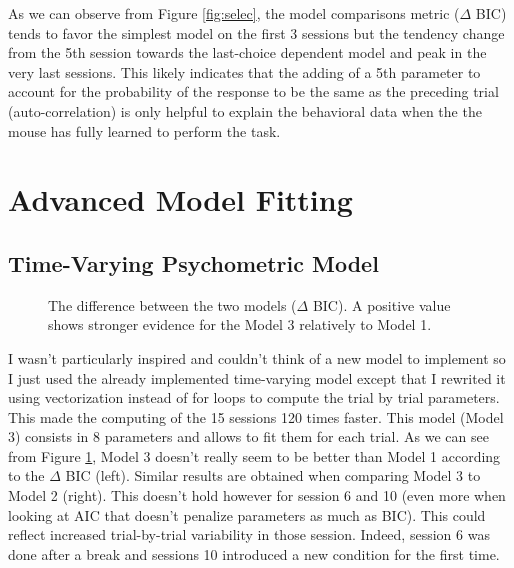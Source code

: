 \documentclass[paper=a4, fontsize=11pt]{scrartcl}
\numberwithin{equation}{section}		%
\numberwithin{figure}{section}			%
\numberwithin{table}{section}				%
\begin{document}
As we can observe from Figure \ref{fig:selec}, the model comparisons metric ($\Delta$ BIC) tends to favor the simplest model on the first 3 sessions but the tendency change from the 5th session towards the last-choice dependent model and peak in the very last sessions. This likely indicates that the adding of a 5th parameter to account for the probability of the response to be the same as the preceding trial (auto-correlation) is only helpful to explain the behavioral data when the the mouse has fully learned to perform the task.



\FloatBarrier

\section{Advanced Model Fitting}
\subsection{Time-Varying Psychometric Model}
\begin{figure}[!hbt]
\begin{center}
\end{center}
\caption{The difference between the two models ($\Delta$ BIC). A positive value shows stronger evidence for the Model 3 relatively to Model 1.}
\label{fig:time}
\end{figure}




I wasn't particularly inspired and couldn't think of a new model to implement so I just used the already implemented time-varying model except that I rewrited it using vectorization instead of for loops to compute the trial by trial parameters. This made the computing of the 15 sessions 120 times faster. This model (Model 3) consists in 8 parameters and allows to fit them for each trial. As we can see from Figure \ref{fig:time}, Model 3 doesn't really seem to be better than Model 1 according to the $\Delta$ BIC (left). Similar results are obtained when comparing Model 3 to Model 2 (right). This doesn't hold however for session 6 and 10 (even more when looking at AIC that doesn't penalize parameters as much as BIC). This could reflect increased trial-by-trial variability in those session. Indeed, session 6 was done after a \textquotesingle break \textquotesingle and sessions 10 introduced a new condition for the first time.
\end{document}
